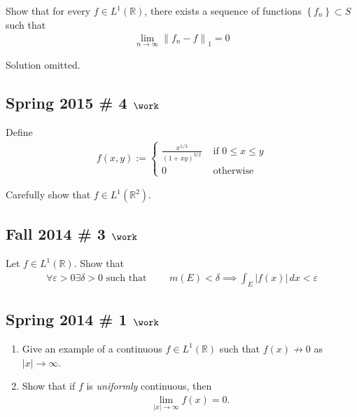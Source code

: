 Show that for every \(f\in L^1({\mathbb{R}})\), there exists a sequence
of functions \(\left\{{f_n}\right\} \subset S\) such that
\begin{align*}
\lim _{n \rightarrow \infty}\left\|f_{n}-f\right\|_{1}=0
\end{align*}


Solution omitted.

\hypertarget{spring-2015-4-work}{%
\subsection{\texorpdfstring{Spring 2015 \# 4
\(\work\)}{Spring 2015 \# 4 \textbackslash work}}\label{spring-2015-4-work}}

Define
\begin{align*}
f(x, y):=\left\{\begin{array}{ll}{\frac{x^{1 / 3}}{(1+x y)^{3 / 2}}} & {\text { if } 0 \leq x \leq y} \\ {0} & {\text { otherwise }}\end{array}\right.
\end{align*}

Carefully show that \(f \in L^1({\mathbb{R}}^2)\).

\hypertarget{fall-2014-3-work}{%
\subsection{\texorpdfstring{Fall 2014 \# 3
\(\work\)}{Fall 2014 \# 3 \textbackslash work}}\label{fall-2014-3-work}}

Let \(f\in L^1({\mathbb{R}})\). Show that
\begin{align*}
\forall\varepsilon > 0 \exists \delta > 0 \text{ such that } \qquad 
m(E) < \delta 
\implies 
\int _{E} |f(x)| \, dx < \varepsilon
\end{align*}

\hypertarget{spring-2014-1-work}{%
\subsection{\texorpdfstring{Spring 2014 \# 1
\(\work\)}{Spring 2014 \# 1 \textbackslash work}}\label{spring-2014-1-work}}

\begin{enumerate}
\def\labelenumi{\arabic{enumi}.}
\item
  Give an example of a continuous \(f\in L^1({\mathbb{R}})\) such that
  \(f(x) \not\to 0\) as\({\left\lvert {x} \right\rvert} \to \infty\).
\item
  Show that if \(f\) is \emph{uniformly} continuous, then
  \begin{align*}
  \lim_{{\left\lvert {x} \right\rvert} \to \infty} f(x) = 0.
  \end{align*}
\end{enumerate}

